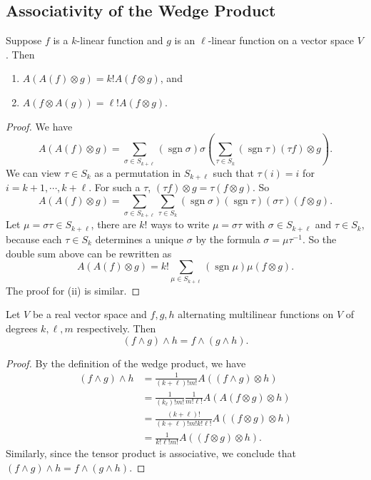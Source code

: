 \subsection{Associativity of the Wedge Product}
\begin{lemma}
    Suppose $f$ is a $k$-linear function and $g$ is an $\ell$-linear function on a vector space $V$. Then
    \begin{enumerate}[label=(\roman*)]
        \item $A(A(f)\otimes g)=k!A(f\otimes g)$, and 
        \item $A(f\otimes A(g))=\ell! A(f\otimes g)$.
    \end{enumerate}
\end{lemma}
\begin{proof}
    We have \[
        A(A(f)\otimes g)= \sum _{\sigma \in S_{k+\ell}}(\operatorname{sgn}\sigma) \sigma \left( \sum _{\tau\in S_k}(\operatorname{sgn}\tau)(\tau f)\otimes g \right) .
    \] We can view $\tau \in S_k$ as a permutation in $S_{k+\ell}$ such that $\tau(i)=i$ for $i=k+1,\cdots ,k+\ell$. For such a $\tau$, $(\tau f)\otimes g=\tau (f\otimes g)$. So \[
    A(A(f)\otimes g)=\sum _{\sigma \in S_{k+\ell}}\sum _{\tau \in {S_k}}(\operatorname{sgn}\sigma)(\operatorname{sgn}\tau) (\sigma \tau)(f\otimes g).
\] Let $\mu =\sigma\tau \in S_{k+\ell}$, there are $k!$ ways to write $\mu=\sigma\tau$ with $\sigma \in S_{k+\ell}$ and $\tau\in S_k$, because each $\tau \in S_k$ determines a unique $\sigma$ by the formula $\sigma=\mu\tau^{-1}$. So the double sum above can be rewritten as \[
A(A(f)\otimes g)=k! \sum _{\mu \in S_{k+\ell}}(\operatorname{sgn}\mu)\mu (f\otimes g).
\]  The proof for (ii) is similar.
\end{proof}
\begin{prop}
    Let $V$ be a real vector space and $f,g,h$ alternating multilinear functions on $V$ of degrees $k,\ell,m$ respectively. Then \[
        (f\wedge g)\wedge h = f\wedge (g\wedge h).
    \] 
\end{prop}
\begin{proof}
    By the definition of the wedge product, we have 
    \begin{align*}
        (f\wedge g)\wedge h &= \frac{1}{(k+\ell)!m!}A((f\wedge g)\otimes h)\\
                            &=\frac{1}{(k_\ell)!m!}\frac{1}{m!\ell!}A(A(f\otimes g)\otimes h)\\
                            &=\frac{(k+\ell)!}{(k+\ell)!m!k!\ell!}A((f\otimes g)\otimes h)\\
                            &=\frac{1}{k!\ell!m!}A((f\otimes g)\otimes h).
    \end{align*}Similarly, since the tensor product is associative, we conclude that $(f\wedge g)\wedge h=f\wedge (g\wedge h)$.
\end{proof}
